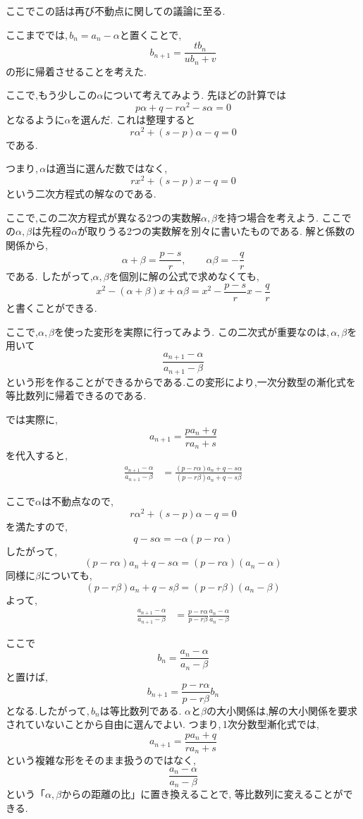     ここでこの話は再び不動点に関しての議論に至る.

    ここまででは,\,$b_n=a_n-\alpha$と置くことで,
    \[
      b_{n+1}=\frac{tb_n}{ub_n+v}
    \]
    の形に帰着させることを考えた.
    
    ここで,もう少しこの$\alpha$について考えてみよう.
    先ほどの計算では
    \[
      p\alpha+q-r\alpha^2-s\alpha=0
    \]
    となるように$\alpha$を選んだ.
    これは整理すると
    \[
      r\alpha^2+(s-p)\alpha-q=0
    \]
    である.
    
    つまり,\,$\alpha$は適当に選んだ数ではなく,
    \[
      rx^2+(s-p)x-q=0
    \]
    という二次方程式の解なのである.
    
    ここで,この二次方程式が異なる2つの実数解$\alpha,\beta$を持つ場合を考えよう.
    ここでの$\alpha,\beta$は先程の$\alpha$が取りうる2つの実数解を別々に書いたものである.
    解と係数の関係から,
    \[
      \alpha+\beta=\frac{p-s}{r},
      \qquad
      \alpha\beta=-\frac qr
    \]
    である.
    したがって,$\alpha,\beta$を個別に解の公式で求めなくても,
    \[
      x^2-(\alpha+\beta)x+\alpha\beta
      =
      x^2-\frac{p-s}{r}x-\frac qr
    \]
    と書くことができる.

    ここで,$\alpha,\beta$を使った変形を実際に行ってみよう.
    この二次式が重要なのは,\,$\alpha,\beta$を用いて
    \[
      \frac{a_{n+1}-\alpha}{a_{n+1}-\beta}
    \]
    という形を作ることができるからである.この変形により,一次分数型の漸化式を等比数列に帰着できるのである.

    では実際に,
    \[
      a_{n+1}=\frac{pa_n+q}{ra_n+s}
    \]
    を代入すると,
    \begin{align*}
      \frac{a_{n+1}-\alpha}{a_{n+1}-\beta}
      &=
      \frac{(p-r\alpha)a_n+q-s\alpha}{(p-r\beta)a_n+q-s\beta}
    \end{align*}
    
    ここで$\alpha$は不動点なので,
    \[
      r\alpha^2+(s-p)\alpha-q=0
    \]
    を満たすので,
    \[
      q-s\alpha
      =-\alpha(p-r\alpha)
    \]
    したがって,
    \[
      (p-r\alpha)a_n+q-s\alpha
      =(p-r\alpha)(a_n-\alpha)
    \]
    同様に$\beta$についても,
    \[
      (p-r\beta)a_n+q-s\beta
      =(p-r\beta)(a_n-\beta)
    \]
    よって,
    \begin{align*}
      \frac{a_{n+1}-\alpha}{a_{n+1}-\beta}
      &=
      \frac{p-r\alpha}{p-r\beta}
      \frac{a_n-\alpha}{a_n-\beta}
    \end{align*}
    
    ここで
    \[
      b_n=\frac{a_n-\alpha}{a_n-\beta}
    \]
    と置けば,
    \[
      b_{n+1}
      =
      \frac{p-r\alpha}{p-r\beta}b_n
    \]
    となる.したがって,\,$b_n$は等比数列である.
    $\alpha$と$\beta$の大小関係は,解の大小関係を要求されていないことから自由に選んでよい.
    つまり,\,1次分数型漸化式では,
    \[
      a_{n+1}=\frac{pa_n+q}{ra_n+s}
    \]
    という複雑な形をそのまま扱うのではなく,
    \[
      \frac{a_n-\alpha}{a_n-\beta}
    \]
    という「$\alpha,\beta$からの距離の比」に置き換えることで,
    等比数列に変えることができる.

